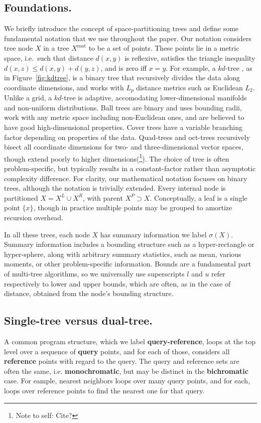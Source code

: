 \documentclass[twoside,leqno,twocolumn]{article}
\newcommand{\authornote}[1]{(\footnote{Note to self: #1})}
\newcommand{\authorsnote}[1]{\authornote{#1}}
\newcommand{\union}{\cup}
\newcommand{\fig}[1]{Figure~\ref{fig:#1}}
\newcommand{\mysub}[1]{\subsection{#1.}}
\newcommand{\defterm}[1]{{\bf #1}}
\newcommand{\kdroot}[1]{#1^{\text{root}}}
\newcommand{\kdleft}[1]{#1^{\!L}}
\newcommand{\kdright}[1]{#1^{\!R}}
\newcommand{\kdparent}[1]{#1^{\!P}}
\newcommand{\dist}[2]{d(#1,#2)}
\newcommand{\outstat}{\sigma}
\begin{document}
\mysub{Foundations}
We briefly introduce the concept of space-partitioning trees and define some fundamental notation that we use throughout the paper.
Our notation considers tree node $X$ in a tree $\kdroot{X}$ to be a set of points.
These points lie in a metric space, i.e.~such that distance $\dist{x}{y}$ is reflexive, satisfies the triangle inequality $\dist{x}{z} \leq \dist{x}{y} + \dist{y}{z}$, and is zero iff $x = y$.
For example, a $kd$-tree \cite{preparata_kdtrees}, as in \fig{kdtree}, is a binary tree that recursively divides the data along coordinate dimensions, and works with $L_p$ distance metrics such as Euclidean $L_2$.
Unlike a grid, a $kd$-tree is adaptive, accomodating lower-dimensional manifolds and non-uniform distributions.
Ball trees \cite{anchors_balltrees_moore} are binary and uses bounding radii, work with any metric space including non-Euclidean ones, and are believed to have good high-dimensional properties.
Cover trees \cite{covertrees} have a variable branching factor depending on properties of the data.
Quad-trees and oct-trees recursively bisect all coordinate dimensions for two- and three-dimensional vector spaces, though extend poorly to higher dimensions\authorsnote{Cite?}.
The choice of tree is often problem-specific, but typically results in a constant-factor rather than asymptotic complexity difference.
For clarity, our mathematical notation focuses on binary trees, although the notation is trivially extended.
Every internal node is partitioned $X = \kdleft{X} \union \kdright{X}$, with parent $\kdparent{X} \supset X$.
Conceptually, a leaf is a single point $\{x\}$, though in practice multiple points may be grouped to amortize recursion overhead.

In all these trees, each node $X$ has summary information we label $\outstat(X)$.
Summary information includes a bounding structure such as a hyper-rectangle or hyper-sphere, along with arbitrary summary statistics, such as mean, various moments, or other problem-specific information.
Bounds are a fundamental part of multi-tree algorithms, so we universally use superscripts $l$ and $u$ refer respectively to lower and upper bounds, which are often, as in the case of distance, obtained from the node's bounding structure.

\mysub{Single-tree versus dual-tree}
A common program structure, which we label \defterm{query-reference}, loops at the top level over a sequence of \defterm{query} points, and for each of those, considers all \defterm{reference} points with regard to the query.
The query and reference sets are often the same, i.e. \defterm{monochromatic}, but may be distinct in the \defterm{bichromatic} case.
For eample, nearest neighbors loops over many query points, and for each, loops over reference points to find the nearest one for that query.
\end{document}
